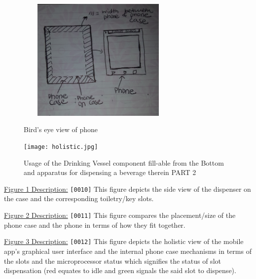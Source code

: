 \documentclass[11pt]{article}
\begin{document}
{\begin{figure}[h]
    \caption{Bird's eye view of phone }
    \centering\includegraphics[height=6cm, width=8cm]{bird.jpg}
    \label{fig:design}
\end{figure}

\begin{figure}[h]
    \caption{Usage of the Drinking Vessel component fill-able from the Bottom and apparatus for dispensing a beverage therein PART 2}
    \centering\texttt{[image: holistic.jpg]}
    \label{fig:design}
\end{figure}
\newpage



\newline
\newpage
\nonindent \underline{Figure 1 Description:} \verb|[0010]| This figure depicts the side view of the dispenser on the case and the corresponding toiletry/key slots.

\newline

\nonindent \underline{Figure 2 Description:} \verb|[0011]| This figure compares the placement/size of the phone case and the phone in terms of how they fit together.

\newline

\nonindent \underline{Figure 3 Description:} \verb|[0012]| This figure depicts the holistic view of the mobile app's graphical user interface and the internal phone case mechanisms in terms of the slots and the microprocessor status which signifies the status of slot dispensation (red equates to idle and green signals the said slot to dispense). 

\newline

}
\end{document}
